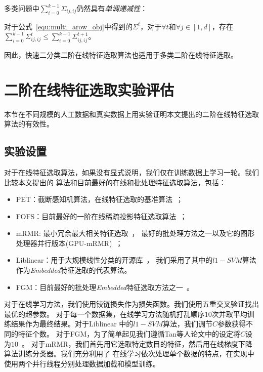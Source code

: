 多类问题中$\sum_{i=0}^{k-1}\Sigma_{ij,ij}$仍然具有\emph{单调递减性}：
\begin{proposition}[单调递减性]
    对于公式~\eqref{equ:multi_arow_obj}中得到的$\Sigma^t$，对于$\forall
    t$和$\forall j \in [1,d]$，存在
    $\sum_{i=0}^{k-1}\Sigma^{t}_{ij,ij} \leq
    \sum_{i=0}^{k-1}\Sigma^{t+1}_{ij,ij}$。
\end{proposition}
因此，快速二分类二阶在线特征选取算法也适用于多类二阶在线特征选取。

\section{二阶在线特征选取实验评估}
本节在不同规模的人工数据和真实数据上用实验证明本文提出的二阶在线特征选取算法的有效性。

\subsection{实验设置}
对于在线特征选取算法，如果没有显式说明，我们仅在训练数据上学习一轮。我们比较本文提出的
算法和目前最好的在线和批处理特征选取算法，包括：
\begin{itemize}
    \item PET：截断感知机算法，在线特征选取的基准算法~\cite{wang2014online}；
    \item FOFS：目前最好的一阶在线稀疏投影特征选取算法~\cite{wang2014online}；
    \item mRMR: 最小冗余最大相关特征选取~\cite{peng2005feature}，
        最好的批处理方法之一以及它的图形处理器并行版本(GPU-mRMR)~\cite{ramirez2016fast}；
    \item Liblinear：用于大规模线性分类的开源库~\cite{fan2008liblinear}，
        我们采用了其中的$l1-SVM$算法作为\emph{Embedded}特征选取的代表算法。 \item
        FGM：目前最好的批处理\emph{Embedded}特征选取方法之一~\cite{tantw14fgm}。
\end{itemize}

对于在线学习方法，我们使用铰链损失作为损失函数。我们使用五重交叉验证找出最优的超参数。
对于每一个数据集，在线学习方法随机打乱顺序$10$次并取平均训练结果作为最终结果。对于Liblinear
中的$l1-SVM$算法，我们调节$C$参数获得不同的特征个数。
对于FGM，为了简单起见我们遵循Tan等人论文中的设定将$C$设为$10$~\cite{tantw14fgm}。
对于mRMR，我们首先用它选取特定数目的特征，然后用在线梯度下降算法训练分类器。我们充分利用了
在线学习依次处理单个数据的特点，在实现中使用两个并行线程分别处理数据加载和模型训练。

